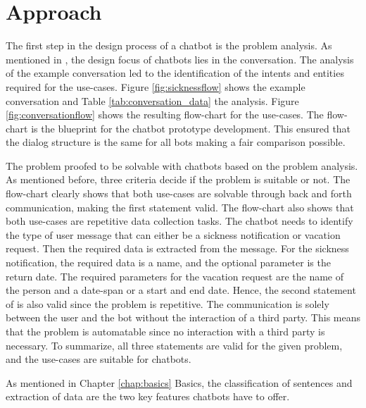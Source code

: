 \section{Approach} %
The first step in the design process of a chatbot is the problem analysis.
As mentioned in \citet{folstad2017chatbots}, the design focus of chatbots lies in the conversation.
The analysis of the example conversation led to the identification of the intents and entities required for the use-cases.
Figure \ref{fig:sicknessflow} shows the example conversation and Table \ref{tab:conversation_data} the analysis.
Figure \ref{fig:conversationflow} shows the resulting flow-chart for the use-cases.
The flow-chart is the blueprint for the chatbot prototype development.
This ensured that the dialog structure is the same for all bots making a fair comparison possible.

The problem proofed to be solvable with chatbots based on the problem analysis.
As mentioned before, three criteria decide if the problem is suitable or not.
The flow-chart clearly shows that both use-cases are solvable through back and forth communication, making the first statement valid.
The flow-chart also shows that both use-cases are repetitive data collection tasks.
The chatbot needs to identify the type of user message that can either be a sickness notification or vacation request.
Then the required data is extracted from the message.
For the sickness notification, the required data is a name, and the optional parameter is the return date.
The required parameters for the vacation request are the name of the person and a date-span or a start and end date.
Hence, the second statement of \citet{singhbuilding} is also valid since the problem is repetitive.
The communication is solely between the user and the bot without the interaction of a third party.
This means that the problem is automatable since no interaction with a third party is necessary.
To summarize, all three statements are valid for the given problem, and the use-cases are suitable for chatbots.

As mentioned in Chapter \ref{chap:basics} Basics, the classification of sentences and extraction of data are the two key features chatbots have to offer.

